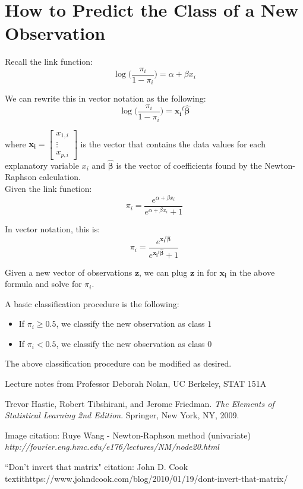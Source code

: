 \documentclass{article}
\begin{document}
\section{How to Predict the Class of a New Observation}

Recall the link function: 
$$
\log \big( \dfrac{\pi_i}{1-\pi_i} \big) = \alpha + \beta x_i
$$

\noindent We can rewrite this in vector notation as the following:
$$
\log \big( \dfrac{\pi_i}{1-\pi_i} \big) = \boldsymbol{x_i}^t \boldsymbol{\hat{\beta}}
$$

where $\boldsymbol{x_i} = \begin{bmatrix} 
    x_{1,i} \\
    \vdots \\
    x_{p,i}
    \end{bmatrix}$ is the vector that contains the data values for each explanatory variable $x_i$ and $\boldsymbol{\hat{\beta}}$ is the vector of coefficients found by the Newton-Raphson calculation.\\
    
\noindent Given the link function:
$$
\pi_i = \dfrac{e^{\alpha + \beta x_i}}{e^{\alpha + \beta x_i} + 1}
$$

\noindent In vector notation, this is:
$$
\pi_i = \dfrac{e^{\boldsymbol{x_i}^t \boldsymbol{\hat{\beta}}}}{e^{\boldsymbol{x_i}^t \boldsymbol{\hat{\beta}}} + 1}
$$

\noindent Given a new vector of observations $\boldsymbol{z}$, we can plug $\boldsymbol{z}$ in for $\boldsymbol{x_i}$ in the above formula and solve for $\pi_i$. 

A basic classification procedure is the following:

\begin{itemize}
    \item If $\pi_i \geq 0.5$, we classify the new observation as class $1$
    \item If $\pi_i < 0.5$, we classify the new observation as class $0$
\end{itemize}

\noindent The above classification procedure can be modified as desired.


\begin{thebibliography}{9}

Lecture notes from Professor Deborah Nolan, UC Berkeley, STAT 151A

Trevor Hastie, Robert Tibshirani, and Jerome Friedman. 
\textit{The Elements of Statistical Learning 2nd Edition}. 
Springer, New York, NY, 2009.

Image citation: Ruye Wang - Newton-Raphson method (univariate)
\textit{http://fourier.eng.hmc.edu/e176/lectures/NM/node20.html}

``Don't invert that matrix" citation: John D. Cook
\\textit{https://www.johndcook.com/blog/2010/01/19/dont-invert-that-matrix/}
\end{thebibliography}
\end{document}
